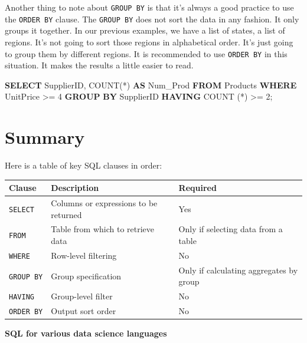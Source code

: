 \documentclass[]{book}
\newenvironment{Shaded}{\begin{snugshade}}{\end{snugshade}}
\newcommand{\KeywordTok}[1]{\textcolor[rgb]{0.13,0.29,0.53}{\textbf{{#1}}}}
\newcommand{\DecValTok}[1]{\textcolor[rgb]{0.00,0.00,0.81}{{#1}}}
\newcommand{\FunctionTok}[1]{\textcolor[rgb]{0.00,0.00,0.00}{{#1}}}
\newcommand{\NormalTok}[1]{{#1}}
\theoremstyle{definition}
\theoremstyle{definition}
\theoremstyle{remark}
\begin{document}
Another thing to note about \texttt{GROUP\ BY} is that it's always a
good practice to use the \texttt{ORDER\ BY} clause. The
\texttt{GROUP\ BY} does not sort the data in any fashion. It only groups
it together. In our previous examples, we have a list of states, a list
of regions. It's not going to sort those regions in alphabetical order.
It's just going to group them by different regions. It is recommended to
use \texttt{ORDER\ BY} in this situation. It makes the results a little
easier to read.

\begin{Shaded}
\begin{Highlighting}[]
\KeywordTok{SELECT} \NormalTok{SupplierID, }\FunctionTok{COUNT}\NormalTok{(*) }\KeywordTok{AS} \NormalTok{Num_Prod}
\KeywordTok{FROM} \NormalTok{Products}
\KeywordTok{WHERE} \NormalTok{UnitPrice >= }\DecValTok{4}
\KeywordTok{GROUP} \KeywordTok{BY} \NormalTok{SupplierID}
\KeywordTok{HAVING} \FunctionTok{COUNT} \NormalTok{(*) >= }\DecValTok{2}\NormalTok{;}
\end{Highlighting}
\end{Shaded}

\section{Summary}\label{summary-1}

Here is a table of key SQL clauses in order:

\begin{longtable}[]{@{}lll@{}}
\toprule
Clause & Description & Required\tabularnewline
\midrule
\endhead
\texttt{SELECT} & Columns or expressions to be returned &
Yes\tabularnewline
\texttt{FROM} & Table from which to retrieve data & Only if selecting
data from a table\tabularnewline
\texttt{WHERE} & Row-level filtering & No\tabularnewline
\texttt{GROUP\ BY} & Group specification & Only if calculating
aggregates by group\tabularnewline
\texttt{HAVING} & Group-level filter & No\tabularnewline
\texttt{ORDER\ BY} & Output sort order & No\tabularnewline
\bottomrule
\end{longtable}

\textbf{SQL for various data science languages}
\end{document}
